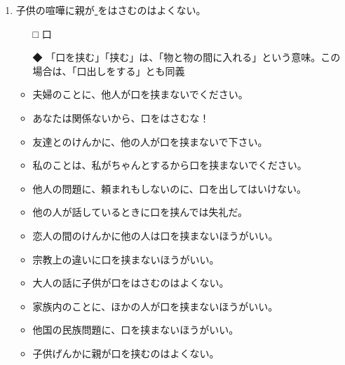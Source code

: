 \documentclass[
uplatex,
b5paper,
10pt,
dvipdfmx
]{jsbook}
\begin{document}
\begin{enumerate}
\item 子供の喧嘩に親が\underline{    }をはさむのはよくない。
\begin{itemize}
\item[□] 口
\item[◆] 「口を挟む」「挟む」は、「物と物の間に入れる」という意味。この
	  場合は、「口出しをする」とも同義
\end{itemize}
\begin{itemize}
\item 夫婦のことに、他人が口を挟まないでください。
\item あなたは関係ないから、口をはさむな！
\item 友達とのけんかに、他の人が口を挟まないで下さい。
\item 私のことは、私がちゃんとするから口を挟まないでください。
\item 他人の問題に、頼まれもしないのに、口を出してはいけない。
\item 他の人が話しているときに口を挟んでは失礼だ。
\item 恋人の間のけんかに他の人は口を挟まないほうがいい。
\item 宗教上の違いに口を挟まないほうがいい。
\item 大人の話に子供が口をはさむのはよくない。
\item 家族内のことに、ほかの人が口を挟まないほうがいい。
\item 他国の民族問題に、口を挟まないほうがいい。
\item 子供げんかに親が口を挟むのはよくない。
\end{itemize}

\end{enumerate}
\end{document}
